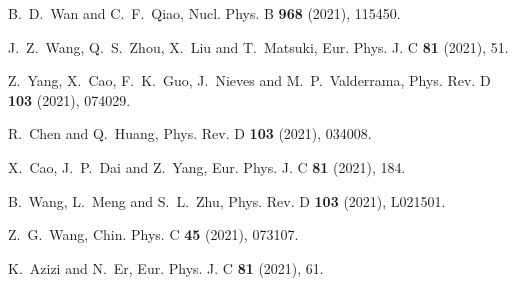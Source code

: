 \documentclass[preprint,12pt,3p]{elsarticle}
\begin{document}
\begin{thebibliography}{99}
B.~D.~Wan and C.~F.~Qiao,
Nucl. Phys. B \textbf{968} (2021), 115450.

J.~Z.~Wang, Q.~S.~Zhou, X.~Liu and T.~Matsuki,
Eur. Phys. J. C \textbf{81} (2021), 51.

Z.~Yang, X.~Cao, F.~K.~Guo, J.~Nieves and M.~P.~Valderrama,
Phys. Rev. D \textbf{103} (2021), 074029.

R.~Chen and Q.~Huang,
Phys. Rev. D \textbf{103} (2021), 034008.

X.~Cao, J.~P.~Dai and Z.~Yang,
Eur. Phys. J. C \textbf{81} (2021), 184.

B.~Wang, L.~Meng and S.~L.~Zhu,
Phys. Rev. D \textbf{103} (2021), L021501.

Z.~G.~Wang,
Chin. Phys. C \textbf{45} (2021), 073107.

K.~Azizi and N.~Er,
Eur. Phys. J. C \textbf{81} (2021), 61.


\end{thebibliography}
\end{document}
